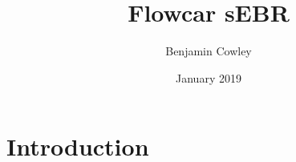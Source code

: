 \documentclass{article}
\title{Flowcar sEBR}
\author{Benjamin Cowley}
\date{January 2019}
\begin{document}
\maketitle

\section{Introduction}
\end{document}
